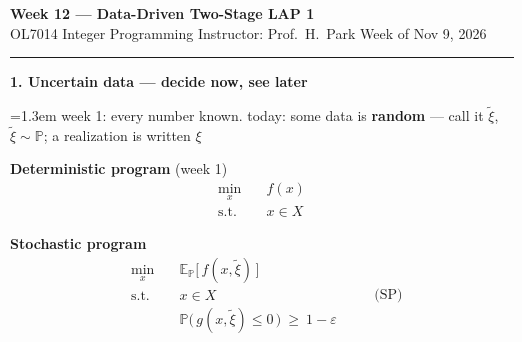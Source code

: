 \documentclass[10pt]{article}
\newcommand{\beat}[2]{%
  \par\medskip\needspace{8\baselineskip}%
  {\color{ruleink}\rule{\textwidth}{1pt}}\par\nobreak\vspace{2pt}
  {\large\bfseries #1.\; #2}\par\nobreak\vspace{3pt}}
\newenvironment{board}{%
  \par\vspace{2pt}
  \begingroup\leftskip=1.3em\relax}{%
  \par\endgroup\vspace{2pt}}
\begin{document}
{\Large\bfseries Week 12 --- Data-Driven Two-Stage LAP 1}\\[2pt]
{\small OL7014 Integer Programming \quad\textbullet\quad Instructor: Prof.\ H.\ Park \quad\textbullet\quad Week of Nov 9, 2026}

\beat{1}{Uncertain data --- decide now, see later}
\begin{board}
week 1: every number known. \quad today: some data is \textbf{random} --- call it $\tilde{\xi}$, \ $\tilde{\xi} \sim \mathbb{P}$; \quad a realization is written $\xi$
\vspace{4pt}

\noindent
\begin{minipage}[t]{0.36\linewidth}
\centering
\textbf{Deterministic program} (week 1)
\[
\begin{aligned}
  \min_x\quad & f(x) \\
  \text{s.t.}\quad & x \in X
\end{aligned}
\]
\end{minipage}%
\hfill%
\begin{minipage}[t]{0.61\linewidth}
\centering
\textbf{Stochastic program}
\[
\boxed{\;
\begin{aligned}
  \min_x\quad & \mathbb{E}_{\mathbb{P}}\bigl[\, f(x, \tilde{\xi}) \,\bigr] \\
  \text{s.t.}\quad & x \in X \\
                   & \mathbb{P}\bigl(\, g(x, \tilde{\xi}) \le 0 \,\bigr) \ \ge\ 1 - \varepsilon
\end{aligned}
\;}
\qquad \text{(SP)}
\]
\end{minipage}%
\end{board}
\end{document}
